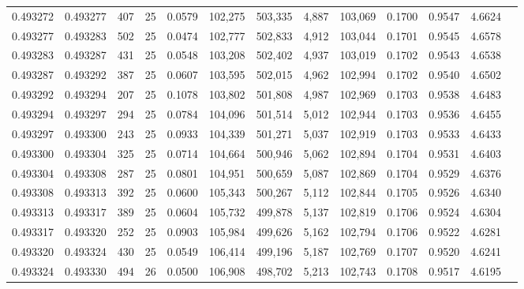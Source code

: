 \begin{tabular}{rrrrrrrrrrrrr}
0.493272 & 0.493277 &   407 &  25 &                                     0.0579 & 102,275 & 503,335 &   4,887 & 103,069 & 0.1700 & 0.9547 & 4.6624 \\
0.493277 & 0.493283 &   502 &  25 &                                     0.0474 & 102,777 & 502,833 &   4,912 & 103,044 & 0.1701 & 0.9545 & 4.6578 \\
0.493283 & 0.493287 &   431 &  25 &                                     0.0548 & 103,208 & 502,402 &   4,937 & 103,019 & 0.1702 & 0.9543 & 4.6538 \\
0.493287 & 0.493292 &   387 &  25 &                                     0.0607 & 103,595 & 502,015 &   4,962 & 102,994 & 0.1702 & 0.9540 & 4.6502 \\
0.493292 & 0.493294 &   207 &  25 &                                     0.1078 & 103,802 & 501,808 &   4,987 & 102,969 & 0.1703 & 0.9538 & 4.6483 \\
0.493294 & 0.493297 &   294 &  25 &                                     0.0784 & 104,096 & 501,514 &   5,012 & 102,944 & 0.1703 & 0.9536 & 4.6455 \\
0.493297 & 0.493300 &   243 &  25 &                                     0.0933 & 104,339 & 501,271 &   5,037 & 102,919 & 0.1703 & 0.9533 & 4.6433 \\
0.493300 & 0.493304 &   325 &  25 &                                     0.0714 & 104,664 & 500,946 &   5,062 & 102,894 & 0.1704 & 0.9531 & 4.6403 \\
0.493304 & 0.493308 &   287 &  25 &                                     0.0801 & 104,951 & 500,659 &   5,087 & 102,869 & 0.1704 & 0.9529 & 4.6376 \\
0.493308 & 0.493313 &   392 &  25 &                                     0.0600 & 105,343 & 500,267 &   5,112 & 102,844 & 0.1705 & 0.9526 & 4.6340 \\
0.493313 & 0.493317 &   389 &  25 &                                     0.0604 & 105,732 & 499,878 &   5,137 & 102,819 & 0.1706 & 0.9524 & 4.6304 \\
0.493317 & 0.493320 &   252 &  25 &                                     0.0903 & 105,984 & 499,626 &   5,162 & 102,794 & 0.1706 & 0.9522 & 4.6281 \\
0.493320 & 0.493324 &   430 &  25 &                                     0.0549 & 106,414 & 499,196 &   5,187 & 102,769 & 0.1707 & 0.9520 & 4.6241 \\
0.493324 & 0.493330 &   494 &  26 &                                     0.0500 & 106,908 & 498,702 &   5,213 & 102,743 & 0.1708 & 0.9517 & 4.6195 \\

\end{tabular}
